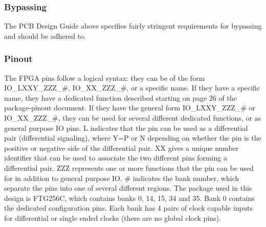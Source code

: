 \subsubsection{Bypassing}
\label{sec:xc7a15t-ftg256-bypassing}

The PCB Design Guide above specifies fairly stringent requirements for bypassing and should be adhered to.

\subsubsection{Pinout}
\label{sec:xc7a15t-ftg256-pinout}

The FPGA pins follow a logical syntax: they can be of the form IO\_LXXY\_ZZZ\_\#, IO\_XX\_ZZZ\_\#,
or a specific name. If they have a specific name, they have a dedicated function described starting
on page 26 of the package-pinout document. If they have the general form IO\_LXXY\_ZZZ\_\# or
IO\_XX\_ZZZ\_\#, they can be used for several different dedicated functions, or as general purpose
IO pins. L indicates that the pin can be used as a differential pair (differential signaling), where
Y=P or N depending on whether the pin is the positive or negative side of the differential pair. XX
gives a unique number identifier that can be used to associate the two different pins forming a
differential pair. ZZZ represents one or more functions that the pin can be used for in addition to
general purpose IO. \# indicates the bank number, which separate the pins into one of several
different regions. The package used in this design is FTG256C, which contains banks 0, 14, 15, 34
and 35. Bank 0 contains the dedicated configuration pins. Each bank has 4 pairs of clock capable
inputs for differential or single ended clocks (there are no global clock pins).


